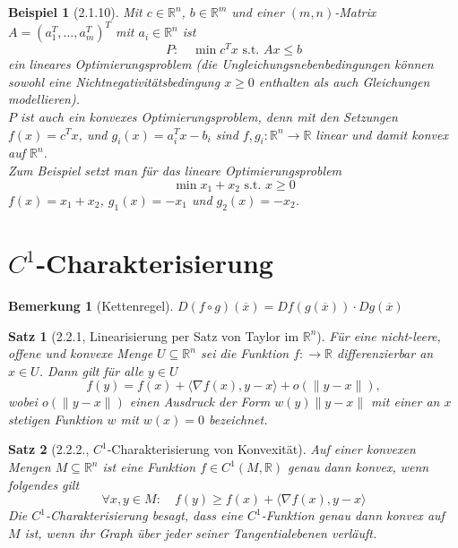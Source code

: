 \documentclass[12pt]{extreport} %
\newcommand{\R}{\mathbb{R}}
\theoremstyle{named}
\theoremstyle{nnamed}
\theoremstyle{itshape}
\newtheorem*{satz}{Satz}
\theoremstyle{normal}
\newtheorem*{beispiel}{Beispiel}
\newtheorem*{bemerkung}{Bemerkung}
\begin{document}
\begin{beispiel}[2.1.10]
	Mit $c \in \R^n$, $b \in \R^m$ und einer $(m, n)$-Matrix $A = (a_1^T, \dotsc, a_m^T)^T$ mit $a_i \in \R^n$ ist
	$$ P: \quad \min c^T x \text{ s.t. } Ax \leq b $$
	ein lineares Optimierungsproblem (die Ungleichungsnebenbedingungen können sowohl eine Nichtnegativitätsbedingung $x \geq 0$ enthalten als auch Gleichungen modellieren). ~\\
	
	$P$ ist auch ein konvexes Optimierungsproblem, denn mit den Setzungen $f(x) = c^T x$, und $g_i(x) = a_i^T x - b_i$ sind $f, g_i \colon \R^n \rightarrow \R$ linear und damit konvex auf $\R^n$. ~\\
	
	Zum Beispiel setzt man für das lineare Optimierungsproblem
	$$ \min x_1 + x_2 \text{ s.t. } x \geq 0 $$
	$f(x) = x_1 + x_2$, $g_1(x) = - x_1$ und $g_2(x) = -x_2$.
\end{beispiel}

\section{$C^1$-Charakterisierung}

\begin{bemerkung}[Kettenregel] $D(f \circ g)(\overline{x}) = D f(g(\overline{x})) \cdot D g(\overline{x})$	
\end{bemerkung}

\begin{satz}[2.2.1, Linearisierung per Satz von Taylor im $\R^n$]
	Für eine nicht-leere, offene und konvexe Menge $U \subseteq \R^n$ sei die Funktion $f \colon \rightarrow \R$ differenzierbar an $x \in U$. Dann gilt für alle $y \in U$	
	$$ f(y) = f(x) + \langle \nabla f(x), y - x \rangle + o \left( \| y - x \| \right), $$
	wobei $o \left( \| y - x \| \right)$ einen Ausdruck der Form $w(y) \| y - x \|$ mit einer an $x$ stetigen Funktion $w$ mit $w(x) = 0$ bezeichnet.
\end{satz}

\begin{satz}[2.2.2., $C^1$-Charakterisierung von Konvexität]
	Auf einer konvexen Mengen $M \subseteq \R^n$ ist eine Funktion $f \in C^1(M, \R)$	 genau dann konvex, wenn folgendes gilt
	$$ \forall x, y \in M: \quad f(y) \geq f(x) + \langle \nabla f(x), y - x \rangle $$
	Die $C^1$-Charakterisierung besagt, dass eine $C^1$-Funktion genau dann konvex auf $M$ ist, wenn ihr Graph über jeder seiner Tangentialebenen verläuft.
\end{satz}
\end{document}
